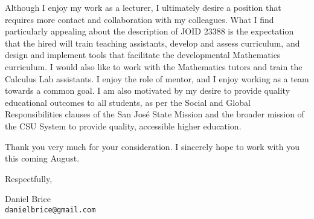 \documentclass[10pt]{article}
\begin{document}
Although I enjoy my work as a lecturer, I ultimately desire a position
that requires more contact and collaboration with my colleagues. What I
find particularly appealing about the description of JOID 23388 is the
expectation that the hired will train teaching assistants, develop and
assess curriculum, and design and implement tools that facilitate the
developmental Mathematics curriculum. I would also like to work with the
Mathematics tutors and train the Calculus Lab assistants. I enjoy the
role of mentor, and I enjoy working as a team towards a common goal. I
am also motivated by my desire to provide quality educational outcomes
to all students, as per the Social and Global Responsibilities clauses
of the San Jos\'{e} State Mission and the broader mission of the CSU
System to provide quality, accessible higher education.

\vfill

Thank you very much for your consideration. I sincerely hope to work
with you this coming August.

\vfill

Respectfully,

\vfill

Daniel Brice\\
\texttt{danielbrice@gmail.com}

\label{page:last}
\end{document}
